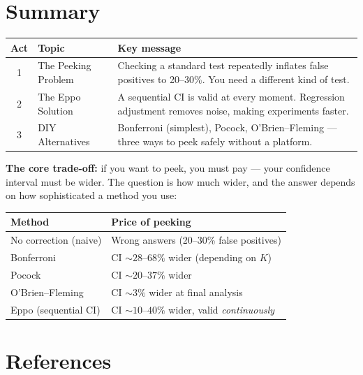 \documentclass[12pt, a4paper]{article}
\begin{document}
\section{Summary}

\begin{center}
\renewcommand{\arraystretch}{1.3}
\begin{tabular}{@{} c l p{8cm} @{}}
\toprule
\textbf{Act} & \textbf{Topic} & \textbf{Key message} \\
\midrule
1 & The Peeking Problem
  & Checking a standard test repeatedly inflates false positives to
    20--30\%.  You need a different kind of test. \\
2 & The Eppo Solution
  & A sequential CI is valid at every moment.  Regression adjustment
    removes noise, making experiments faster. \\
3 & DIY Alternatives
  & Bonferroni (simplest), Pocock, O'Brien--Fleming --- three ways to
    peek safely without a platform. \\
\bottomrule
\end{tabular}
\end{center}

\bigskip
\textbf{The core trade-off:} if you want to peek, you must pay --- your
confidence interval must be wider.  The question is how much wider, and the
answer depends on how sophisticated a method you use:

\begin{center}
\begin{tabular}{@{} l l @{}}
\toprule
\textbf{Method} & \textbf{Price of peeking} \\
\midrule
No correction (naive) & Wrong answers (20--30\% false positives) \\
Bonferroni & CI $\sim\!28$--$68\%$ wider (depending on $K$) \\
Pocock & CI $\sim\!20$--$37\%$ wider \\
O'Brien--Fleming & CI $\sim\!3\%$ wider at final analysis \\
Eppo (sequential CI) & CI $\sim\!10$--$40\%$ wider, valid \emph{continuously} \\
\bottomrule
\end{tabular}
\end{center}


\newpage
\section{References}
\end{document}
